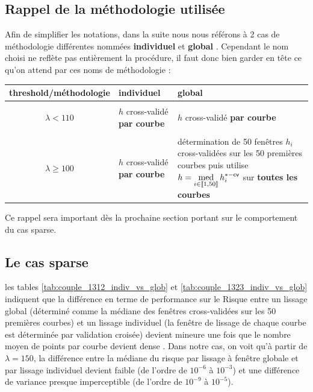 \subsection{Rappel de la méthodologie utilisée}

Afin de simplifier les notations, dans la suite nous nous référons à 2 cas de méthodologie différentes nommées \og \textbf{individuel} \fg et \og \textbf{global} \fg. Cependant le nom choisi ne reflète pas entièrement la procédure, il faut donc bien garder en tête ce qu'on attend par ces noms de méthodologie :

\begin{table}[H]
	\centering
	\begin{tabularx}{\textwidth}{c|X|X}
		\toprule
		threshold/méthodologie & \textbf{individuel}                  & \textbf{global}                                                                                                                                                                                                               \\
		\bottomrule
		\\
		$\lambda < 110$        & $h$ cross-validé \textbf{par courbe} & $h$ cross-validé \textbf{par courbe}
		\\
		\midrule
		\\
		$\lambda \geq 100$     & $h$ cross-validé \textbf{par courbe} & détermination de 50 fenêtres $h_i$ cross-validées sur les 50 premières courbes puis utilise $h = \operatornamewithlimits{med}\limits_{i \in \llbracket 1, 50 \rrbracket} h_i^{*-\textsf{cv}}$ sur \textbf{toutes les courbes}
		\\
		\bottomrule
	\end{tabularx}
\end{table}

Ce rappel sera important dès la prochaine section portant sur le comportement du cas sparse.

\subsection{Le cas sparse}

les tables \ref{tab:couple_1312_indiv_vs_glob} et \ref{tab:couple_1323_indiv_vs_glob} indiquent que la différence en terme de performance sur le Risque entre un lissage global (déterminé comme la médiane des fenêtres cross-validées sur les 50 premières courbes) et un lissage individuel (la fenêtre de lissage de chaque courbe est déterminée par validation croisée) devient mineure une fois que le nombre moyen de points par courbe devient \og dense \fg. Dans notre cas, on voit qu'à partir de $\lambda = 150$, la différence entre la médiane du risque par lissage à fenêtre globale et par lissage individuel devient faible (de l'ordre de $10^{-6}$ à $10^{-3}$) et une différence de variance presque imperceptible (de l'ordre de $10^{-9}$ à $10^{-5}$).





